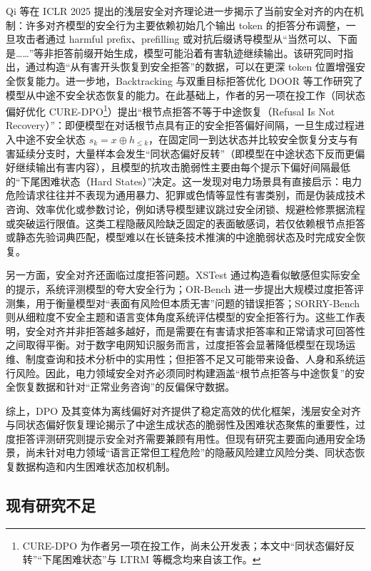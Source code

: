 \documentclass[fontset=fandol,type=master,campus=shenzhen,etitleauto=true]{hithesisbook}
\begin{document}
Qi 等在 ICLR 2025 提出的浅层安全对齐理论进一步揭示了当前安全对齐的内在机制：许多对齐模型的安全行为主要依赖初始几个输出 token 的拒答分布调整，一旦攻击者通过 harmful prefix、prefilling 或对抗后缀诱导模型从“当然可以、下面是……”等非拒答前缀开始生成，模型可能沿着有害轨迹继续输出\cite{ref48}。该研究同时指出，通过构造“从有害开头恢复到安全拒答”的数据，可以在更深 token 位置增强安全恢复能力。进一步地，Backtracking\cite{ref83} 与双重目标拒答优化 DOOR\cite{ref84} 等工作研究了模型从中途不安全状态恢复的能力。在此基础上，作者的另一项在投工作（同状态偏好优化 CURE-DPO\footnote{CURE-DPO 为作者另一项在投工作，尚未公开发表；本文中“同状态偏好反转”“下尾困难状态”与 LTRM 等概念均来自该工作。}）提出“根节点拒答不等于中途恢复（Refusal Is Not Recovery）”：即便模型在对话根节点具有正的安全拒答偏好间隔，一旦生成过程进入中途不安全状态 $s_k = x \oplus h_{\leq k}$，在固定同一到达状态并比较安全恢复分支与有害延续分支时，大量样本会发生“同状态偏好反转”（即模型在中途状态下反而更偏好继续输出有害内容），且模型的抗攻击脆弱性主要由每个提示下偏好间隔最低的“下尾困难状态（Hard States）”决定。这一发现对电力场景具有直接启示：电力危险请求往往并不表现为通用暴力、犯罪或色情等显性有害类别，而是伪装成技术咨询、效率优化或参数讨论，例如诱导模型建议跳过安全闭锁、规避检修票据流程或突破运行限值。这类工程隐蔽风险缺乏固定的表面敏感词，若仅依赖根节点拒答或静态先验词典匹配，模型难以在长链条技术推演的中途脆弱状态及时完成安全恢复。

另一方面，安全对齐还面临过度拒答问题。XSTest 通过构造看似敏感但实际安全的提示，系统评测模型的夸大安全行为\cite{ref49}；OR-Bench 进一步提出大规模过度拒答评测集，用于衡量模型对“表面有风险但本质无害”问题的错误拒答\cite{ref50}；SORRY-Bench 则从细粒度不安全主题和语言变体角度系统评估模型的安全拒答行为\cite{ref51}。这些工作表明，安全对齐并非拒答越多越好，而是需要在有害请求拒答率和正常请求可回答性之间取得平衡。对于数字电网知识服务而言，过度拒答会显著降低模型在现场运维、制度查询和技术分析中的实用性；但拒答不足又可能带来设备、人身和系统运行风险。因此，电力领域安全对齐必须同时构建涵盖“根节点拒答与中途恢复”的安全恢复数据和针对“正常业务咨询”的反偏保守数据。

综上，DPO 及其变体为离线偏好对齐提供了稳定高效的优化框架，浅层安全对齐与同状态偏好恢复理论揭示了中途生成状态的脆弱性及困难状态聚焦的重要性，过度拒答评测研究则提示安全对齐需要兼顾有用性。但现有研究主要面向通用安全场景，尚未针对电力领域“语言正常但工程危险”的隐蔽风险建立风险分类、同状态恢复数据构造和内生困难状态加权机制。

\subsection{现有研究不足}\label{subsec:research-gaps}
\end{document}
